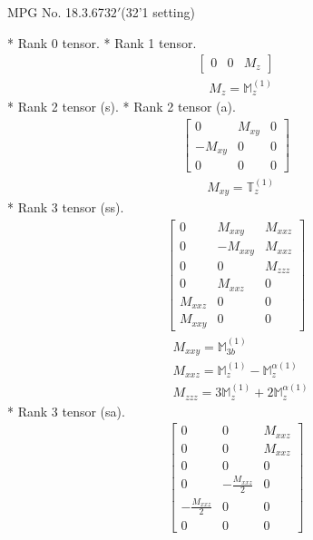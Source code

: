 \documentclass[fleqn,8pt,landscape]{jsarticle}
\begin{document}
\setcounter{MaxMatrixCols}{32}

\renewcommand{\tablename}{Table~}
\renewcommand{\figurename}{Figure~}
\begin{center}
\LARGE
MPG No. 18.3.67\quad$32'$\quad(32'1 setting)
\end{center}
* Rank 0 tensor.
* Rank 1 tensor.
\begin{align*}
\begin{bmatrix} 0 & 0 & M_{z} \end{bmatrix}
\end{align*}
\begin{align*}
& M_{z} = \mathbb{M}_{z}^{(1)}
\end{align*}
* Rank 2 tensor (s).
* Rank 2 tensor (a).
\begin{align*}
\begin{bmatrix} 0 & M_{xy} & 0 \\ - M_{xy} & 0 & 0 \\ 0 & 0 & 0 \end{bmatrix}
\end{align*}
\begin{align*}
& M_{xy} = \mathbb{T}_{z}^{(1)}
\end{align*}
* Rank 3 tensor (ss).
\begin{align*}
\begin{bmatrix} 0 & M_{xxy} & M_{xxz} \\ 0 & - M_{xxy} & M_{xxz} \\ 0 & 0 & M_{zzz} \\ 0 & M_{xxz} & 0 \\ M_{xxz} & 0 & 0 \\ M_{xxy} & 0 & 0 \end{bmatrix}
\end{align*}
\begin{align*}
& M_{xxy} = \mathbb{M}_{3b}^{(1)} \\
& M_{xxz} = \mathbb{M}_{z}^{(1)} - \mathbb{M}_{z}^{\alpha(1)} \\
& M_{zzz} = 3 \mathbb{M}_{z}^{(1)} + 2 \mathbb{M}_{z}^{\alpha(1)}
\end{align*}
* Rank 3 tensor (sa).
\begin{align*}
\begin{bmatrix} 0 & 0 & M_{xxz} \\ 0 & 0 & M_{xxz} \\ 0 & 0 & 0 \\ 0 & - \frac{M_{xxz}}{2} & 0 \\ - \frac{M_{xxz}}{2} & 0 & 0 \\ 0 & 0 & 0 \end{bmatrix}
\end{align*}
\end{document}
